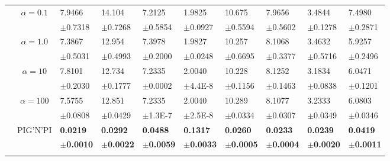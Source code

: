 \documentclass{article}
\newcommand{\pignpi}{PIG'N'PI\xspace}
\begin{document}
\begin{table}[h!]
{\begin{tabularx}{\textwidth}{ccX X X X X X X X}
        & \multirow{2}{*}{$\alpha=0.1$}
        & 7.9466 & 14.104 & 7.2125 & 1.9825 & 10.675 & 7.9656 & 3.4844 & 7.4980\\
        &&\scriptsize$\pm$0.7318 & \scriptsize $\pm$0.7268 & \scriptsize $\pm$0.5854 & \scriptsize $\pm$0.0927 & \scriptsize $\pm$0.5594 & \scriptsize $\pm$0.5602 & \scriptsize $\pm$0.1278 & \scriptsize $\pm$0.2871\\

        \cline{3-10}\rule{0pt}{2.3ex}
        
        & \multirow{2}{*}{$\alpha=1.0$}
        & 7.3867 & 12.954 & 7.3978 & 1.9827 & 10.257 & 8.1068 & 3.4632 & 5.9257\\
        &&\scriptsize$\pm$0.5031 & \scriptsize $\pm$0.4993 & \scriptsize $\pm$0.2000 & \scriptsize $\pm$0.0248 & \scriptsize $\pm$0.6695 & \scriptsize $\pm$0.3377 & \scriptsize $\pm$0.5716 & \scriptsize $\pm$0.2496\\


        \cline{3-10}\rule{0pt}{2.3ex}
        & \multirow{2}{*}{$\alpha=10$}
        & 7.8101 & 12.734 & 7.2335 & 2.0040 & 10.228 & 8.1252 & 3.1834 & 6.0471\\
        &&\scriptsize$\pm$0.2030 & \scriptsize $\pm$0.1777 & \scriptsize $\pm$0.0002 & \tiny $\pm$4.4E-8 & \scriptsize $\pm$0.1156 & \scriptsize $\pm$0.1463 & \scriptsize $\pm$0.0838 & \scriptsize $\pm$0.1201\\

        \cline{3-10}\rule{0pt}{2.3ex}
        & \multirow{2}{*}{$\alpha=100$}
        & 7.5755 & 12.851 & 7.2335 & 2.0040 & 10.289 & 8.1077 & 3.2333 & 6.0803\\
        &&\scriptsize$\pm$0.0808 & \scriptsize $\pm$0.0429 & \tiny $\pm$1.3E-7 & \tiny $\pm$2.5E-8 & \scriptsize $\pm$0.0334 & \scriptsize $\pm$0.0307 & \scriptsize $\pm$0.0349 & \scriptsize $\pm$0.0346\\

        \cline{3-10}\rule{0pt}{2.3ex}
        &\multirow{2}{*}{\pignpi}
        &\textbf{0.0219} & \textbf{0.0292} & \textbf{0.0488} & \textbf{0.1317} & \textbf{0.0260} & \textbf{0.0233} & \textbf{0.0239} & \textbf{0.0419}\\
        &&\scriptsize\textbf{$\pm$0.0010} & \scriptsize \textbf{$\pm$0.0022} & \scriptsize \textbf{$\pm$0.0059} & \scriptsize \textbf{$\pm$0.0033} & \scriptsize \textbf{$\pm$0.0005} & \scriptsize \textbf{$\pm$0.0004} & \scriptsize \textbf{$\pm$0.0020} & \scriptsize \textbf{$\pm$0.0011}\\
        \hline\rule{0pt}{2.3ex}
        

\end{tabularx}}
\end{table}
\end{document}
